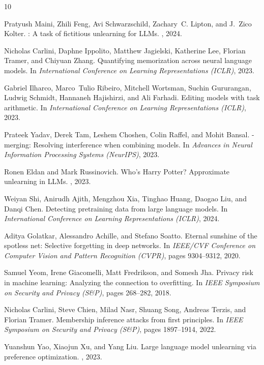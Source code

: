\documentclass[11pt,a4paper]{article}
\begin{document}

\begin{thebibliography}{10}

Pratyush Maini, Zhili Feng, Avi Schwarzschild, Zachary~C. Lipton, and J.~Zico Kolter.
: A task of fictitious unlearning for {LLMs}.
, 2024.

Nicholas Carlini, Daphne Ippolito, Matthew Jagielski, Katherine Lee, Florian Tramer, and Chiyuan Zhang.
\newblock Quantifying memorization across neural language models.
\newblock In {\em International Conference on Learning Representations (ICLR)}, 2023.

Gabriel Ilharco, Marco~Tulio Ribeiro, Mitchell Wortsman, Suchin Gururangan, Ludwig Schmidt, Hannaneh Hajishirzi, and Ali Farhadi.
\newblock Editing models with task arithmetic.
\newblock In {\em International Conference on Learning Representations (ICLR)}, 2023.

Prateek Yadav, Derek Tam, Leshem Choshen, Colin Raffel, and Mohit Bansal.
-merging: Resolving interference when combining models.
\newblock In {\em Advances in Neural Information Processing Systems (NeurIPS)}, 2023.

Ronen Eldan and Mark Russinovich.
\newblock Who's {Harry} {Potter}? {Approximate} unlearning in {LLMs}.
, 2023.

Weiyan Shi, Anirudh Ajith, Mengzhou Xia, Tinghao Huang, Daogao Liu, and Danqi Chen.
\newblock Detecting pretraining data from large language models.
\newblock In {\em International Conference on Learning Representations (ICLR)}, 2024.

Aditya Golatkar, Alessandro Achille, and Stefano Soatto.
\newblock Eternal sunshine of the spotless net: Selective forgetting in deep networks.
\newblock In {\em IEEE/CVF Conference on Computer Vision and Pattern Recognition (CVPR)}, pages 9304--9312, 2020.

Samuel Yeom, Irene Giacomelli, Matt Fredrikson, and Somesh Jha.
\newblock Privacy risk in machine learning: Analyzing the connection to overfitting.
\newblock In {\em IEEE Symposium on Security and Privacy (S\&P)}, pages 268--282, 2018.

Nicholas Carlini, Steve Chien, Milad Nasr, Shuang Song, Andreas Terzis, and Florian Tramer.
\newblock Membership inference attacks from first principles.
\newblock In {\em IEEE Symposium on Security and Privacy (S\&P)}, pages 1897--1914, 2022.

Yuanshun Yao, Xiaojun Xu, and Yang Liu.
\newblock Large language model unlearning via preference optimization.
, 2023.

\end{thebibliography}
\end{document}
